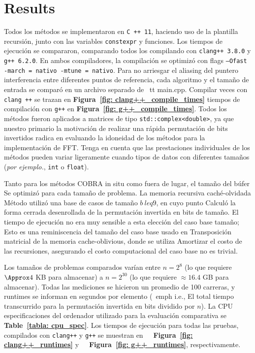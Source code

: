﻿\documentclass[10pt]{article}
\begin{document}
{\section*{Results}
Todos los métodos se implementaron en {\tt C ++ 11}, haciendo uso de la plantilla recursión, junto con las variables {\tt constexpr} y funciones. Los tiempos de ejecución se compararon, comparando todos los compilando con {\tt clang++ 3.8.0} y {\tt g++ 6.2.0}. En ambos compiladores, la compilación se optimizó con flags {\tt –Ofast -march = nativo -mtune = nativo}. Para no arriesgar el aliasing del puntero interferencia entre diferentes puntos de referencia, cada algoritmo y el tamaño de entrada se comparó en un archivo separado de {\ tt main.cpp}. Compilar veces con {\tt clang ++} se trazan en {\bf Figura~\ref{fig: clang++_compile_times}} tiempos de compilación con {\tt g++} en {\bf Figura~\ref{fig: g++_compile_times}}. Todos los métodos fueron aplicados a matrices de tipo {\tt std::complex<double>}, ya que nuestro primario la motivación de realizar una rápida permutación de bits invertidos radica en evaluando la idoneidad de los métodos para la implementación de FFT. Tenga en cuenta que las prestaciones individuales de los métodos pueden variar ligeramente cuando tipos de datos con diferentes tamaños (\emph{por ejemplo.}, {\tt int} o {\tt float}).

Tanto para los métodos COBRA in situ como fuera de lugar, el tamaño del búfer
Se optimizó para cada tamaño de problema. La memoria recursiva caché-olvidada
Método utilizó una base de casos de tamaño $ b \ leq 9 $, en cuyo punto
Calculó la forma cerrada desenrollada de la permutación invertida en bits de
tamaño. El tiempo de ejecución no era muy sensible a esta elección del caso base tamaño; Esto es una reminiscencia del tamaño del caso base usado en
Transposición matricial de la memoria cache-oblivious, donde se utiliza
Amortizar el costo de las recursiones, asegurando el costo computacional del caso base no es trivial.

Los tamaños de problemas comparados varían entre $n = 2^8$ (lo que requiere $\Approx 4$ KB para almacenar) a $n = 2^{30}$ (lo que requiere $\approx
16.4$ GB para almacenar). Todas las mediciones se hicieron un promedio de 100 carreras, y runtimes se informan en segundos por elemento (\ emph {i.e.}, El total tiempo transcurrido para la permutación invertida en bits dividido por $ n $). La CPU especificaciones del ordenador utilizado para la evaluación comparativa se
{\bf Table~\ref{tabla: cpu_spec}}. Los tiempos de ejecución para todas las pruebas, compilados con {\tt clang++} y {\tt g++} se muestran en {\bf
  Figura~\ref{fig: clang++_runtimes}} y {\bf
  Figura~\ref{fig: g++_runtimes}}, respectivamente.

}
\end{document}

